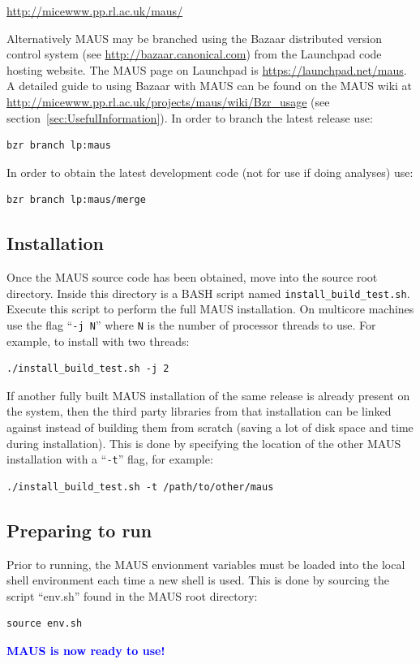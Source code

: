 \documentclass[a4paper,10pt]{article}
\begin{document}
    \medskip
    \url{http://micewww.pp.rl.ac.uk/maus/} 
    \medskip

    Alternatively MAUS may be branched using the Bazaar distributed version control system (see \url{http://bazaar.canonical.com}) from the Launchpad code hosting website. The MAUS page on Launchpad is \url{https://launchpad.net/maus}. A detailed guide to using Bazaar with MAUS can be found on the MAUS wiki at \url{http://micewww.pp.rl.ac.uk/projects/maus/wiki/Bzr_usage} (see section~\ref{sec:UsefulInformation}). In order to branch the latest release use:
    \begin{lstlisting}
bzr branch lp:maus
    \end{lstlisting}
    In order to obtain the latest development code (not for use if doing analyses) use:
    \begin{lstlisting}
bzr branch lp:maus/merge
    \end{lstlisting}

  \subsection{Installation}
    Once the MAUS source code has been obtained, move into the source root directory. Inside this directory is a BASH script named \texttt{install\_build\_test.sh}. Execute this script to perform the full MAUS installation. On multicore machines use the flag ``\texttt{-j N}'' where \texttt{N} is the number of processor threads to use. For example, to install with two threads:
    \begin{lstlisting}
./install_build_test.sh -j 2
    \end{lstlisting}
    If another fully built MAUS installation of the same release is already present on the system, then the third party libraries from that installation can be linked against instead of building them from scratch (saving a lot of disk space and time during installation).  This is done by specifying the location of the other MAUS installation with a ``\texttt{-t}'' flag, for example:
    \begin{lstlisting}
./install_build_test.sh -t /path/to/other/maus
    \end{lstlisting}

  \subsection{Preparing to run}
    Prior to running, the MAUS envionment variables must be loaded into the local shell environment each time a new shell is used.  This is done by sourcing the script ``env.sh'' found in the MAUS root directory:
    \begin{lstlisting}
source env.sh
    \end{lstlisting}
    \textbf{\textcolor{blue}{MAUS is now ready to use!}}
    
\end{document}
